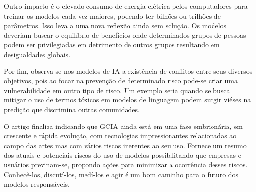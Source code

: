 Outro impacto é o elevado consumo de energia elétrica pelos computadores para treinar os modelos 
cada vez maiores, podendo ter bilhões ou trilhões de parâmetros. Isso leva a uma nova reflexão ainda sem solução. 
Os modelos deveriam buscar o equilíbrio de benefícios onde determinados grupos de 
pessoas podem ser privilegiadas em detrimento de outros grupos resultando em desigualdades globais.


Por fim, observa-se nos modelos de IA a existência de conflitos entre seus diversos objetivos, pois ao focar na prevenção 
de determinado risco pode-se criar uma vulnerabilidade em outro tipo de risco. Um exemplo seria quando se busca mitigar 
o uso de termos tóxicos em modelos de linguagem podem surgir viéses na predição que discrimina outras 
comunidades.

O artigo finaliza indicando que GCIA ainda está em uma fase embrionária, em crescente e rápida evolução, 
com tecnologias impressionantes relacionadas ao campo das artes mas com vários riscos inerentes ao seu uso. 
Fornece um resumo dos atuais e potenciais riscos do uso de modelos possibilitando que empresas
e usuários previnam-se, propondo ações para minimizar a ocorrência desses riscos.
Conhecê-los, discutí-los, medí-los e agir é um bom caminho para o futuro dos modelos responsáveis.
